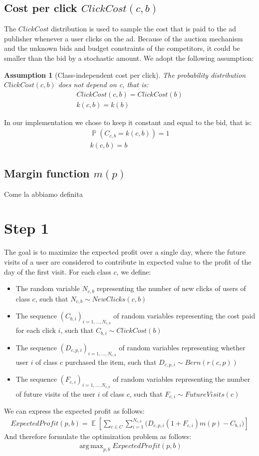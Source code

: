 \documentclass[11pt]{article} %
\DeclareMathOperator{\EX}{\mathbb{E}}
\DeclareMathOperator{\Prob}{\mathbb{P}}
\DeclareMathOperator*{\argmax}{arg\,max}
\newtheorem*{assumption}{Assumption}
\begin{document}
\subsection{Cost per click $ClickCost(c,b)$}
The $ClickCost$ distribution is used to sample the cost that is paid to the ad publisher whenever a user clicks on the ad. Because of the  auction mechanism and the unknown bids and budget constraints of the competitors, it could be smaller than the bid by a stochastic amount.
We adopt the following assumption: 
\begin{assumption}[Class-independent cost per click] The probability distribution $ClickCost(c,b)$ does not depend on c, that is:
\begin{align*}
ClickCost(c,b)=ClickCost(b)\\
k(c,b) = k(b)
\end{align*}
\end{assumption}
In our implementation we chose to keep it constant and equal to the bid, that is:
\begin{align*}
\Prob(C_{c,b} = k(c,b)) = 1\\
k(c,b) = b
\end{align*}
\subsection{Margin function $m(p)$}
{\color{red}Come la abbiamo definita}
\section{Step 1}
The goal is to maximize the expected profit over a single day, where the future visits of a user are considered to contribute in expected value to the profit of the day of the first visit.
\newline
\newline
For each class $c$, we define:
\begin{itemize}
\item The random variable $N_{c,b}$ representing the number of new clicks of users of class $c$, such that $N_{c,b} \sim NewClicks(c,b)$
\item The sequence $(C_{b,i})_{i=1,...,N_{c,b}}$ of random variables representing the cost paid for each click $i$, such that $C_{b,i}\sim ClickCost(b)$
\item The sequence $(D_{c,p,i})_{i=1,...,N_{c,b}}$ of random variables representing whether user $i$ of class $c$ purchased the item, such that $D_{c,p,i}\sim Bern(r(c,p))$
\item The sequence $(F_{c,i})_{i=1,...,N_{c,b}}$ of random variables representing the number of future visits of the user $i$ of class $c$, such that $F_{c,i}\sim FutureVisits(c)$
\end{itemize}
We can express the expected profit as follows:
\begin{align*}
ExpectedProfit(p,b) = \EX\left[\sum_{c \in C}{\sum_{i =1}^{N_{c,b}}{\bigg( D_{c,p,i}(1+F_{c,i})m(p)-C_{b,i}\bigg)}}\right]
\end{align*}
And therefore formulate the optimization problem as follows:
\begin{align*}
\argmax_{p,b}{ExpectedProfit(p,b)}
\end{align*}
\end{document}
